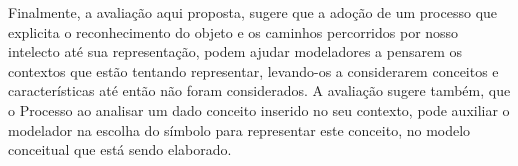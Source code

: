 Finalmente, a avaliação aqui proposta, sugere que a adoção de um processo que explicita o reconhecimento do objeto e os caminhos percorridos por nosso intelecto até sua representação, podem ajudar modeladores a pensarem os contextos que estão tentando representar, levando-os a considerarem conceitos e características até então não foram considerados. A avaliação sugere também, que o Processo ao analisar um dado conceito inserido no seu contexto, pode auxiliar o modelador na escolha do símbolo para representar este conceito, no modelo conceitual que está sendo elaborado.